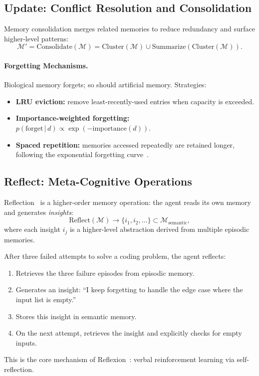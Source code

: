 \subsection{Update: Conflict Resolution and Consolidation}
\label{update-conflict-resolution-and-consolidation}

Memory consolidation merges related memories to reduce redundancy and surface higher-level patterns: 
\[
\mathcal{M}' = \text{Consolidate}(\mathcal{M}) = \text{Cluster}(\mathcal{M}) \cup \text{Summarize}(\text{Cluster}(\mathcal{M})).
\]

\paragraph{Forgetting Mechanisms.}
\label{forgetting-mechanisms.}

Biological memory forgets; so should artificial memory. Strategies:

\begin{itemize}
  \item \textbf{LRU eviction:} remove least-recently-used entries when capacity is exceeded.
  \item \textbf{Importance-weighted forgetting:} $p(\text{forget}\,|\,d) \propto \exp(-\text{importance}(d))$.
  \item \textbf{Spaced repetition:} memories accessed repeatedly are retained longer, following the exponential forgetting curve~\cite{ebbinghaus1885memory}.
\end{itemize}

\subsection{Reflect: Meta-Cognitive Operations}
\label{reflect-meta-cognitive-operations}

Reflection~\cite{park2023generative, shinn2023reflexion} is a higher-order memory operation: the agent reads its own memory and generates \emph{insights}: 
\[
\text{Reflect}(\mathcal{M}) \to \{i_1, i_2, \ldots\} \subset \mathcal{M}_\text{semantic},
\]
 where each insight $i_j$ is a higher-level abstraction derived from multiple episodic memories.

\begin{examplebox}
After three failed attempts to solve a coding problem, the agent reflects:

\begin{enumerate}
  \item Retrieves the three failure episodes from episodic memory.
  \item Generates an insight: ``I keep forgetting to handle the edge case where the input list is empty.''
  \item Stores this insight in semantic memory.
  \item On the next attempt, retrieves the insight and explicitly checks for empty inputs.
\end{enumerate}

This is the core mechanism of Reflexion~\cite{shinn2023reflexion}: verbal reinforcement learning via self-reflection.
\end{examplebox}

